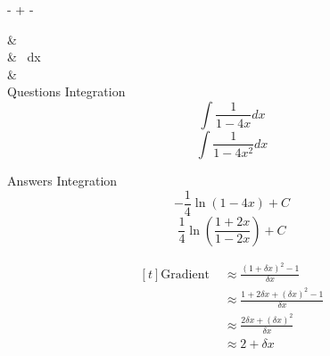 
 -  + - 


& \\ 


& \ dx\\ 

&\\ 


Questions Integration
\[\int {\frac{1}{{1 - 4x}}dx} \]
\[\int {\frac{1}{{1 - 4{x^2}}}dx}\]

Answers Integration 
\[- \frac{1}{4}\ln \left( {1 - 4x} \right) + C\]
\[\frac{1}{4}\ln \left( {\frac{{1 + 2x}}{{1 - 2x}}} \right) + C\]



\[\begin{aligned}[t] 
\text{Gradient } &\approx \frac{(1+\delta{x})^2-1}{\delta{x}}\\ 
& \approx \frac{1+2\delta{x}+(\delta{x})^2 -1}{\delta{x}}\\ 
& \approx \frac{2\delta{x}+(\delta{x})^2}{\delta{x}}\\ 
&\approx 2+\delta{x} 
\end{aligned}\]